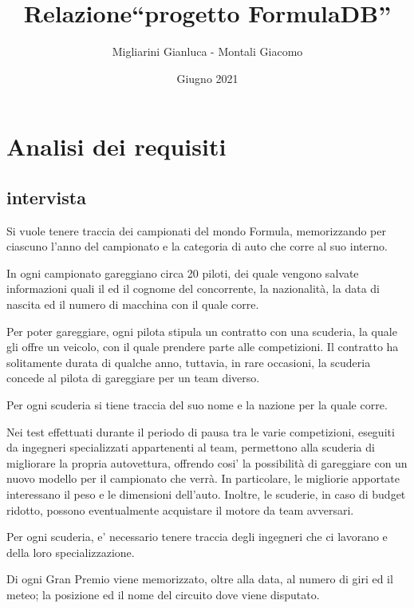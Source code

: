 \documentclass[a4paper,12pt]{report}
\title{Relazione\break``progetto FormulaDB''}
\author{Migliarini Gianluca - Montali Giacomo}
\date{Giugno 2021}
\begin{document}
	
	\maketitle
	\chapter{Analisi dei requisiti}
		\section{intervista}
		
		Si vuole tenere traccia dei campionati del mondo Formula, memorizzando per ciascuno l'anno del campionato e la categoria di auto che corre al suo interno.
		
		In ogni campionato gareggiano circa 20 piloti, dei quale vengono salvate informazioni quali il ed il cognome del concorrente,
		la nazionalità, la data di nascita ed il numero di macchina con il quale corre.
		
		Per poter gareggiare, ogni pilota stipula un contratto con una scuderia, la quale gli offre un veicolo, con il quale
		prendere parte alle competizioni. Il contratto ha solitamente durata di qualche anno, tuttavia, in rare occasioni,
		la scuderia concede al pilota di gareggiare per un team diverso.
		
		Per ogni scuderia si tiene traccia del suo nome e la nazione per la quale corre.
		
		Nei test effettuati durante il periodo di pausa tra le varie competizioni, eseguiti da ingegneri specializzati appartenenti al team,
		permettono alla scuderia di migliorare la propria autovettura, offrendo cosi' la possibilità di gareggiare
		con un nuovo modello per il campionato che verrà. In particolare, le migliorie apportate interessano il peso e le dimensioni dell'auto.
		Inoltre, le scuderie, in caso di budget ridotto, possono eventualmente acquistare il motore da team avversari.
		
		Per ogni scuderia, e' necessario tenere traccia degli ingegneri che ci lavorano e della loro specializzazione.
		
		Di ogni Gran Premio viene memorizzato, oltre alla data, al numero di giri ed il meteo;
		la posizione ed il nome del circuito dove viene disputato.
		
\end{document}
